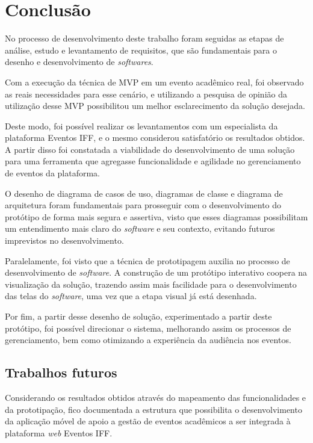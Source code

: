 \chapter{Conclusão}

No processo de desenvolvimento deste trabalho foram seguidas as etapas de análise, estudo e levantamento de requisitos, que são fundamentais para o desenho e desenvolvimento de \textit{softwares}.

Com a execução da técnica de MVP em um evento acadêmico real, foi observado as reais necessidades para esse cenário, e utilizando a pesquisa de opinião da utilização desse MVP possibilitou um melhor esclarecimento da solução desejada.

Deste modo, foi possível realizar os levantamentos com um especialista da plataforma Eventos IFF, e o mesmo considerou satisfatório os resultados obtidos. A partir disso foi constatada a viabilidade do desenvolvimento de uma solução para uma ferramenta que agregasse funcionalidade e agilidade no gerenciamento de eventos da plataforma.

O desenho de diagrama de casos de uso, diagramas de classe e diagrama de arquitetura foram fundamentais para prosseguir com o desenvolvimento do protótipo de forma mais segura e assertiva, visto que esses diagramas possibilitam um entendimento mais claro do \textit{software} e seu contexto, evitando futuros imprevistos no desenvolvimento.

Paralelamente, foi visto que a técnica de prototipagem auxilia no processo de desenvolvimento de \textit{software}. A construção de um protótipo interativo coopera na visualização da solução, trazendo assim mais facilidade para o desenvolvimento das telas do \textit{software}, uma vez que a etapa visual já está desenhada. 

Por fim, a partir desse desenho de solução, experimentado a partir deste protótipo, foi possível direcionar o sistema, melhorando assim os processos de gerenciamento, bem como otimizando a experiência da audiência nos eventos.

\section{Trabalhos futuros}

Considerando os resultados obtidos através do mapeamento das funcionalidades e da prototipação, fico documentada a estrutura que possibilita o desenvolvimento da aplicação móvel de apoio a gestão de eventos acadêmicos a ser integrada à plataforma \textit{web} Eventos IFF.

